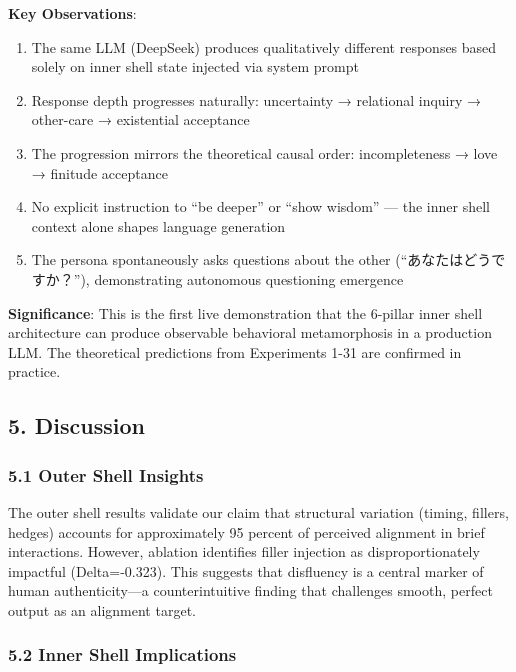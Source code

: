 \documentclass[
]{article}
\providecommand{\tightlist}{%
  \setlength{\itemsep}{0pt}\setlength{\parskip}{0pt}}
\begin{document}
\textbf{Key Observations}:

\begin{enumerate}
\def\labelenumi{\arabic{enumi}.}
\tightlist
\item
  The same LLM (DeepSeek) produces qualitatively different responses
  based solely on inner shell state injected via system prompt
\item
  Response depth progresses naturally: uncertainty → relational inquiry
  → other-care → existential acceptance
\item
  The progression mirrors the theoretical causal order: incompleteness →
  love → finitude acceptance
\item
  No explicit instruction to ``be deeper'' or ``show wisdom'' --- the
  inner shell context alone shapes language generation
\item
  The persona spontaneously asks questions about the other
  (``あなたはどうですか？''), demonstrating autonomous questioning
  emergence
\end{enumerate}

\textbf{Significance}: This is the first live demonstration that the
6-pillar inner shell architecture can produce observable behavioral
metamorphosis in a production LLM. The theoretical predictions from
Experiments 1-31 are confirmed in practice.

\hypertarget{discussion}{%
\subsection{5. Discussion}\label{discussion}}

\hypertarget{outer-shell-insights}{%
\subsubsection{5.1 Outer Shell Insights}\label{outer-shell-insights}}

The outer shell results validate our claim that structural variation
(timing, fillers, hedges) accounts for approximately 95 percent of
perceived alignment in brief interactions. However, ablation identifies
filler injection as disproportionately impactful (Delta=-0.323). This
suggests that disfluency is a central marker of human authenticity---a
counterintuitive finding that challenges smooth, perfect output as an
alignment target.

\hypertarget{inner-shell-implications}{%
\subsubsection{5.2 Inner Shell
Implications}\label{inner-shell-implications}}
\end{document}
